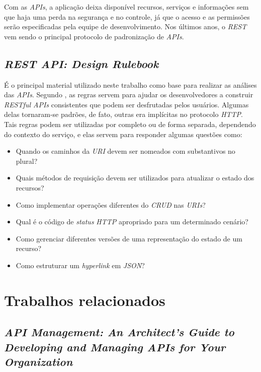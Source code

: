 Com as \textit{APIs}, a aplicação deixa disponível recursos, serviços e informações sem que haja uma perda na segurança e no controle, já que o acesso e as permissões serão especificadas pela equipe de desenvolvimento. Nos últimos anos, o \textit{REST} vem sendo o principal protocolo de padronização de \textit{APIs}.

\subsection{\textit{REST API: Design Rulebook}}

É o principal material utilizado neste trabalho como base para realizar as análises das \textit{APIs}. Segundo \cite{Masse:2016}, as regras servem para ajudar os desenvolvedores a construir \textit{RESTful APIs} consistentes que podem ser desfrutadas pelos usuários. Algumas delas tornaram-se padrões, de fato, outras era implícitas no protocolo \textit{HTTP}. Tais regras podem ser utilizadas por completo ou de forma separada, dependendo do contexto do serviço, e elas servem para responder algumas questões como:

\begin{itemize}
	\item Quando os caminhos da \textit{URI} devem ser nomeados com substantivos no plural?
	\item Quais métodos de requisição devem ser utilizados para atualizar o estado dos recursos?
	\item Como implementar operações diferentes do \textit{CRUD} nas \textit{URIs}?
	\item Qual é o código de \textit{status} \textit{HTTP} apropriado para um determinado cenário?
	\item Como gerenciar diferentes versões de uma representação do estado de um recurso?
	\item Como estruturar um \textit{hyperlink} em \textit{JSON}? 
\end{itemize}

\section{Trabalhos relacionados}

\subsection{\textit{API Management: An Architect’s Guide to Developing and Managing APIs for Your Organization}}

